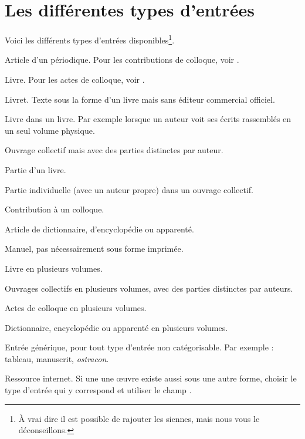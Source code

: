 \section{Les différentes types d'entrées}
Voici les différents types d'entrées disponibles\footnote{À vrai dire il est possible de rajouter les siennes, mais nous vous le déconseillons.}.


\begin{choix}

	\item[\type{article}] 
Article d'un périodique. Pour les contributions de colloque, voir .
	\item[\type{book}] 
Livre. Pour les actes de colloque, voir  . 
	\item[\type{booklet}]
	Livret. Texte sous la forme d'un livre mais sans éditeur commercial officiel.
	\item[\type{bookinbook}]
	Livre dans un livre. Par exemple lorsque un auteur  voit ses écrits rassemblés en un seul volume physique. 	
	\item[\type{collection}]
	Ouvrage collectif mais avec des parties distinctes par auteur.
	\item[\type{inbook}]
	Partie d'un livre.
	\item[\type{incollection}]
	Partie individuelle (avec un auteur propre) dans un ouvrage collectif.
	\item[\type{inproceedings}]
	 Contribution à un colloque.
	 \item[\type{inreference}]
	 Article de dictionnaire, d'encyclopédie ou apparenté.
	\item[\type{manual}]
	 Manuel, pas nécessairement sous forme imprimée.
	 \item[\type{mvbook}]
	 Livre en plusieurs volumes.
	 \item[\type{mvcollection}]
	 Ouvrages collectifs en plusieurs volumes, avec des parties distinctes par auteurs.
	 \item[\type{mvproceedings}]
	 Actes de colloque en plusieurs volumes.
	 \item[\type{mvreference}]
	 Dictionnaire, encyclopédie ou apparenté en plusieurs volumes.
	\item[\type{misc}]
	 Entrée générique, pour tout type d'entrée non catégorisable. Par exemple : tableau, manuscrit, \emph{ostracon}. 
	\item[\type{online}]
	Ressource internet. Si une une œuvre existe aussi sous une autre forme, choisir le type d'entrée qui y correspond et utiliser le champ .

\end{choix}
